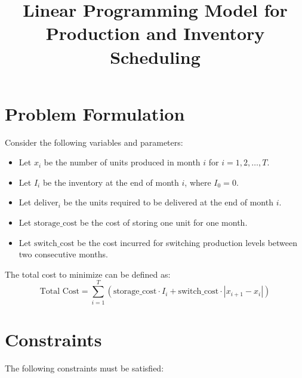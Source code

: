 \documentclass{article}
\begin{document}
\title{Linear Programming Model for Production and Inventory Scheduling}
\author{}
\date{}
\maketitle

\section*{Problem Formulation}

Consider the following variables and parameters:

\begin{itemize}
    \item Let \( x_i \) be the number of units produced in month \( i \) for \( i = 1, 2, \ldots, T \).
    \item Let \( I_i \) be the inventory at the end of month \( i \), where \( I_0 = 0 \).
    \item Let \( \text{deliver}_i \) be the units required to be delivered at the end of month \( i \).
    \item Let \( \text{storage\_cost} \) be the cost of storing one unit for one month.
    \item Let \( \text{switch\_cost} \) be the cost incurred for switching production levels between two consecutive months.
\end{itemize}

The total cost to minimize can be defined as:
\[
\text{Total Cost} = \sum_{i=1}^{T} \left( \text{storage\_cost} \cdot I_i + \text{switch\_cost} \cdot |x_{i+1} - x_i| \right)
\]

\section*{Constraints}

The following constraints must be satisfied:

\end{document}

